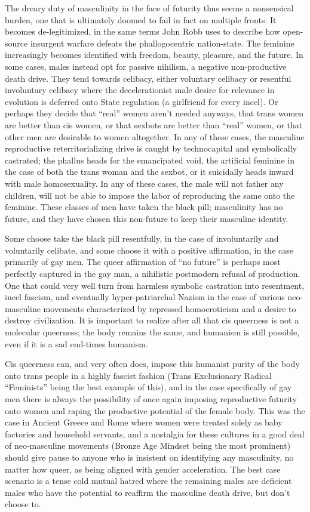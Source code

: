 \documentclass[10pt, statementpaper, twoside, openright]{memoir}
\begin{document}
The dreary duty of masculinity in the face of futurity thus seems a nonsensical burden, one that is ultimately doomed to fail in fact on multiple fronts. It becomes de-legitimized, in the same terms John Robb uses to describe how open-source insurgent warfare defeats the phallogocentric nation-state. The feminine increasingly becomes identified with freedom, beauty, pleasure, and the future. In some cases, males instead opt for passive nihilism, a negative non-productive death drive. They tend towards celibacy, either voluntary celibacy or resentful involuntary celibacy where the decelerationist male desire for relevance in evolution is deferred onto State regulation (a girlfriend for every incel). Or perhaps they decide that ``real'' women aren't needed anyways, that trans women are better than cis women, or that sexbots are better than ``real'' women, or that other men are desirable to women altogether. In any of these cases, the masculine reproductive reterritorializing drive is caught by technocapital and symbolically castrated; the phallus heads for the emancipated void, the artificial feminine in the case of both the trans woman and the sexbot, or it suicidally heads inward with male homosexuality. In any of these cases, the male will not father any children, will not be able to impose the labor of reproducing the same onto the feminine. These classes of men have taken the black pill; masculinity has no future, and they have chosen this non-future to keep their masculine identity.

Some choose take the black pill resentfully, in the case of involuntarily and voluntarily celibate, and some choose it with a positive affirmation, in the case primarily of gay men. The queer affirmation of ``no future'' is perhaps most perfectly captured in the gay man, a nihilistic postmodern refusal of production. One that could very well turn from harmless symbolic castration into resentment, incel fascism, and eventually hyper-patriarchal Nazism in the case of various neo-masculine movements characterized by repressed homoeroticism and a desire to destroy civilization. It is important to realize after all that cis queerness is not a molecular queerness; the body remains the same, and humanism is still possible, even if it is a sad end-times humanism.

Cis queerness can, and very often does, impose this humanist purity of the body onto trans people in a highly fascist fashion (Trans Exclusionary Radical ``Feminists'' being the best example of this), and in the case specifically of gay men there is always the possibility of once again imposing reproductive futurity onto women and raping the productive potential of the female body. This was the case in Ancient Greece and Rome where women were treated solely as baby factories and household servants, and a nostalgia for these cultures in a good deal of neo-masculine movements (Bronze Age Mindset being the most prominent) should give pause to anyone who is insistent on identifying any masculinity, no matter how queer, as being aligned with gender acceleration. The best case scenario is a tense cold mutual hatred where the remaining males are deficient males who have the potential to reaffirm the masculine death drive, but don't choose to.
\end{document}
